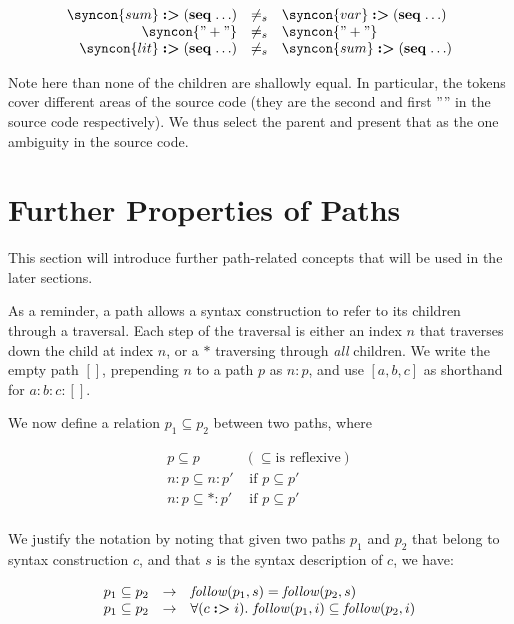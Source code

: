 \documentclass{kththesis}
\begin{document}
$$
\begin{array}{rcl}
\syncon{sum} \tagged (\seq \ldots)
& \not=_s &
\syncon{var} \tagged (\seq \ldots) \\

\syncon{"+"} & \not=_s & \syncon{"+"} \\

\syncon{lit} \tagged (\seq \ldots)
& \not=_s &
\syncon{sum} \tagged (\seq \ldots) \\
\end{array}
$$

Note here than none of the children are shallowly equal. In particular, the  tokens cover different areas of the source code (they are the second and first ''\syncon{+}'' in the source code respectively). We thus select the parent and present that as the one ambiguity in the source code.

\section{Further Properties of Paths} \label{sec:paths}

This section will introduce further path-related concepts that will be used in the later sections.

As a reminder, a path allows a syntax construction to refer to its children through a traversal. Each step of the traversal is either an index $n$ that traverses down the child at index $n$, or a $*$ traversing through \emph{all} children. We write the empty path $[]$, prepending $n$ to a path $p$ as $n : p$, and use $[a, b, c]$ as shorthand for $a : b : c : []$.

We now define a relation $p_1 \subseteq p_2$ between two paths, where

$$
\begin{array}{ll}
p \subseteq p & (\subseteq \text{is reflexive}) \\
n : p \subseteq n : p' & \text{ if } p \subseteq p' \\
n : p \subseteq * : p' & \text{ if } p \subseteq p' \\
\end{array}
$$

We justify the notation by noting that given two paths $p_1$ and $p_2$ that belong to syntax construction $c$, and that $s$ is the syntax description of $c$, we have:

$$
\begin{array}{rcl}
p_1 \subseteq p_2 & -> & \mathit{follow}(p_1, s) = \mathit{follow}(p_2, s) \\
p_1 \subseteq p_2 & -> & \forall (c \mathrel{\textbf{:>}} i).\ \mathit{follow}(p_1, i) \subseteq \mathit{follow}(p_2, i) \\
\end{array}
$$
\end{document}
